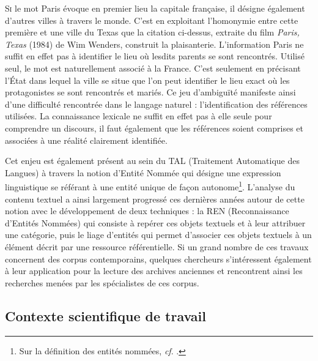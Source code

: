 \documentclass[a4paper,12pt,twoside]{book}
\begin{document}
	
	\lettrine{S}{i} le mot \og Paris\fg{} évoque en premier lieu la capitale française, il désigne également d'autres villes à travers le monde. C'est en exploitant l'homonymie entre cette première et une ville du Texas que la citation ci-dessus, extraite du film \textit{Paris, Texas} (1984) de Wim Wenders, construit la plaisanterie. L'information \og Paris\fg{} ne suffit en effet pas à identifier le lieu où lesdits parents se sont rencontrés. Utilisé seul, le mot est naturellement associé à la France. C'est seulement en précisant l'État dans lequel la ville se situe que l'on peut identifier le lieu exact où les protagonistes se sont rencontrés et mariés. Ce jeu d'ambiguïté manifeste ainsi d'une difficulté rencontrée dans le langage naturel : l'identification des références utilisées. La connaissance lexicale ne suffit en effet pas à elle seule pour comprendre un discours, il faut également que les références soient comprises et associées à une réalité clairement identifiée.
	
	Cet enjeu est également présent au sein du TAL (Traitement Automatique des Langues) à travers la notion d'Entité Nommée qui désigne une expression linguistique se référant à une entité unique de façon autonome\footnote{Sur la définition des entités nommées, \textit{cf}. \cite[p. 167--170]{ehrmann_les_2008}.}. L'analyse du contenu textuel a ainsi largement progressé ces dernières années autour de cette notion avec le développement de deux techniques : la REN (Reconnaissance d'Entités Nommées) qui consiste à repérer ces objets textuels et à leur attribuer une catégorie, puis le liage d'entités qui permet d'associer ces objets textuels à un élément décrit par une ressource référentielle. Si un grand nombre de ces travaux concernent des corpus contemporains, quelques chercheurs s'intéressent également à leur application pour la lecture des archives anciennes et rencontrent ainsi les recherches menées par les spécialistes de ces corpus.
	
	\subsection*{Contexte scientifique de travail}
	
\end{document}
